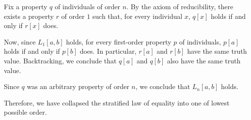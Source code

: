 \begin{concept}
\begin{thmenum}
    Fix a property \( q \) of individuals of order \( n \). By the axiom of reducibility, there exists a property \( r \) of order \( 1 \) such that, for every individual \( x \), \( q[x] \) holds if and only if \( r[x] \) does.

    Now, since \( L_1[a, b] \) holds, for every first-order property \( p \) of individuals, \( p[a] \) holds if and only if \( p[b] \) does. In particular, \( r[a] \) and \( r[b] \) have the same truth value. Backtracking, we conclude that \( q[a] \) and \( q[b] \) also have the same truth value.

    Since \( q \) was an arbitrary property of order \( n \), we conclude that \( L_n[a, b] \) holds.

    Therefore, we have collapsed the stratified law of equality into one of lowest possible order.
  \end{thmenum}
\end{concept}

